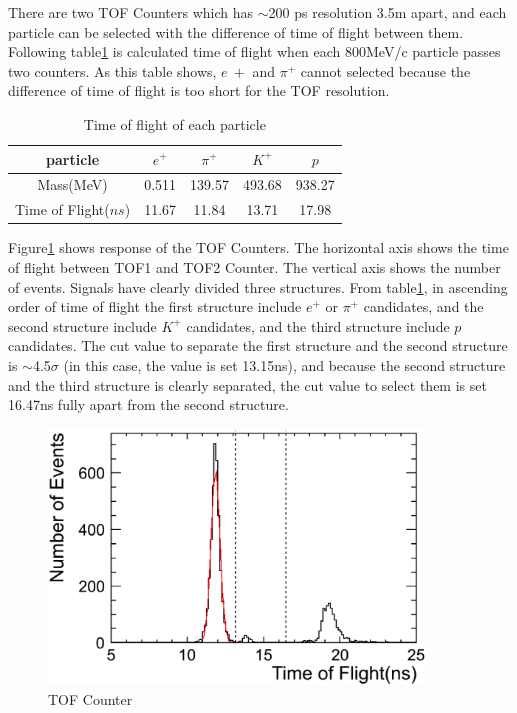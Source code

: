 There are two TOF Counters which has $\sim$200 ps resolution 3.5m apart, 
and each particle can be selected with the difference of time of flight between them.
Following table\ref{tb:TOF_expect} is calculated time of flight when each 800MeV/c particle passes two counters.
As this table shows, $e~{+}$ and $\pi^{+}$ cannot selected because the difference of time of flight is too short for the TOF resolution.\\

\begin{table}
  \centering
  \begin{tabular}[htb]{c|cccc}\hline
    particle & $e^{+}$ & $\pi^{+}$ & $K^{+}$ & $p$ \\ \hline
    Mass(MeV) & 0.511 & 139.57 & 493.68 & 938.27 \\
    Time of Flight($ns$) & 11.67 & 11.84 & 13.71 & 17.98 \\ \hline
  \end{tabular}
  \caption{Time of flight of each particle}
  \label{tb:TOF_expect}
\end{table}

Figure\ref{fig:TOF} shows response of the TOF Counters.
The horizontal axis shows the time of flight between TOF1 and TOF2 Counter.
The vertical axis shows the number of events.
Signals have clearly divided three structures.
From table\ref{tb:TOF_expect}, in ascending order of time of flight the first structure include $e^{+}$ or $\pi^{+}$ candidates,
and the second structure include $K^{+}$ candidates,
and the third structure include $p$ candidates.
The cut value to separate the first structure and the second structure is $\sim$4.5$\sigma$ (in this case, the value is set 13.15ns), and because the second structure and the third structure is clearly separated, the cut value to select them is set 16.47ns fully apart from the second structure.\\

\begin{figure}[htbp]
  \centering
  \includegraphics[width=10cm,clip]{fig/TOF.eps}
  \caption{TOF Counter}
  \label{fig:TOF}
\end{figure}

